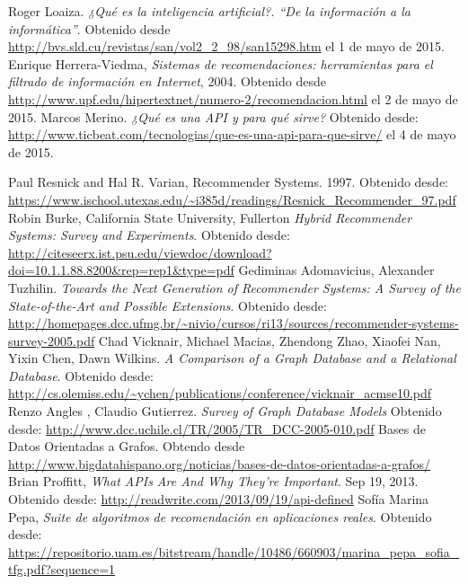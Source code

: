 \begin{thebibliography}{1}
    Roger Loaiza. \emph{¿Qué es la inteligencia artificial?. “De la información a la informática”}. Obtenido desde \url{http://bvs.sld.cu/revistas/san/vol2_2_98/san15298.htm} el 1 de mayo de 2015.
    Enrique Herrera-Viedma, \emph{Sistemas de recomendaciones: herramientas para el filtrado de información en Internet}, 2004. Obtenido desde \url{http://www.upf.edu/hipertextnet/numero-2/recomendacion.html} el 2 de mayo de 2015. 
     Marcos Merino. \emph{¿Qué es una API y para qué sirve?} Obtenido desde: \url{http://www.ticbeat.com/tecnologias/que-es-una-api-para-que-sirve/} el 4 de mayo de 2015. 

    Paul Resnick and Hal R. Varian, Recommender Systems. 1997. Obtenido desde: \url{https://www.ischool.utexas.edu/~i385d/readings/Resnick_Recommender_97.pdf}
    Robin Burke, California State University, Fullerton \emph{Hybrid Recommender Systems: Survey and Experiments}. Obtenido desde: \url{http://citeseerx.ist.psu.edu/viewdoc/download?doi=10.1.1.88.8200\&rep=rep1\&type=pdf}
    Gediminas Adomavicius, Alexander Tuzhilin. \emph{Towards the Next Generation of Recommender Systems: A Survey of the State-of-the-Art and Possible Extensions}. Obtenido desde: \url{http://homepages.dcc.ufmg.br/~nivio/cursos/ri13/sources/recommender-systems-survey-2005.pdf}
    Chad Vicknair, Michael Macias, Zhendong Zhao, Xiaofei Nan, Yixin Chen, Dawn Wilkins. \emph{A Comparison of a Graph Database and a Relational Database}. Obtenido desde: \url{http://cs.olemiss.edu/~ychen/publications/conference/vicknair_acmse10.pdf}
    Renzo Angles , Claudio Gutierrez. \emph{Survey of Graph Database Models} Obtenido desde: \url{http://www.dcc.uchile.cl/TR/2005/TR_DCC-2005-010.pdf}
    Bases de Datos Orientadas a Grafos. Obtendo desde \url{http://www.bigdatahispano.org/noticias/bases-de-datos-orientadas-a-grafos/} 
    Brian Proffitt, \emph{What APIs Are And Why They're Important}. Sep 19, 2013. Obtenido desde: \url{http://readwrite.com/2013/09/19/api-defined}
    Sofía Marina Pepa, \emph{Suite de algoritmos de recomendación en aplicaciones reales}. Obtenido desde: \url{https://repositorio.uam.es/bitstream/handle/10486/660903/marina_pepa_sofia_tfg.pdf?sequence=1}


\end{thebibliography}
